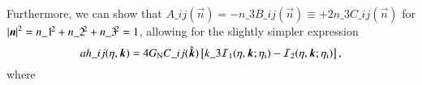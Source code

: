 \begin{draft}
\begin{equation}
    \end{equation}
    Furthermore, we can show  that $A\_{ij}(\vec{n}) = -n\_{3} B\_{ij}(\vec{n})\equiv +2n\_{3} C\_{ij}(\vec{n}) $ for $\abs{\boldsymbol{n}}^2=n\_{1}\!^2 +n\_{2}\!^2 +n\_{3}\!^2 = 1$, allowing for the slightly simpler expression
    \begin{equation}
        ah\_{ij} (\eta, \boldsymbol{k}) = 4G_\mathrm{N}  C\_{ij}(\hat{\boldsymbol{k}}) \left[  k\_{3} \mathcal{I}_1(\eta, \boldsymbol{k}; \eta_\mathrm{i}) - \mathcal{I}_2(\eta, \boldsymbol{k}; \eta_\mathrm{i})  \right],
    \end{equation}
    where



\end{draft}
